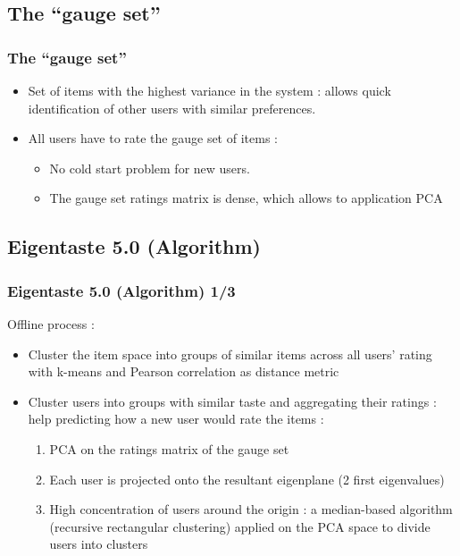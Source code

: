 \documentclass[10pt,handout,english]{beamer}
\begin{document}
		\subsection{The ``gauge set''}
			\begin{frame}
			\frametitle{The ``gauge set''}
				\begin{itemize}
					\item Set of items with the highest variance in the system : allows quick identification of other users with similar preferences.
					\item All users have to rate the gauge set of items :
						\begin{itemize}
							\item No cold start problem for new users.
							\item The gauge set ratings matrix is dense, which allows to application PCA
						\end{itemize}
				\end{itemize}

			\end{frame}

		\subsection{Eigentaste 5.0 (Algorithm)}
			\begin{frame}
			\frametitle{Eigentaste 5.0 (Algorithm) 1/3}
				Offline process :
				\begin{itemize}
					\item Cluster the item space into groups of similar items across all users' rating with k-means and Pearson correlation as distance metric
					\item Cluster users into groups with similar taste and aggregating their ratings : help predicting how a new user would rate the items :
						\begin{enumerate}
							\item PCA on the ratings matrix of the gauge set
							\item Each user is projected onto the resultant eigenplane (2 first eigenvalues)
							\item High concentration of users around the origin : a median-based algorithm (recursive rectangular clustering) applied on the PCA space to divide users into clusters
						\end{enumerate}
				\end{itemize}

			\end{frame}
\end{document}
